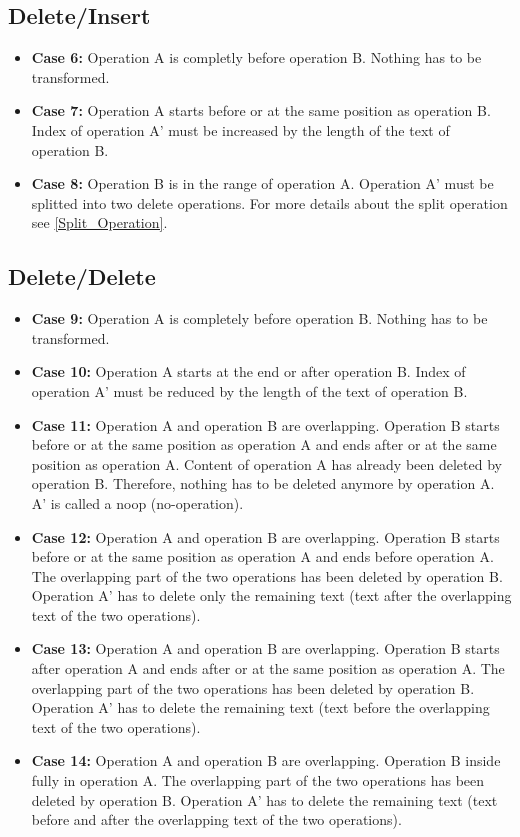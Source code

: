 \subsection{Delete/Insert}
\label{Delete_Insert}
\begin{itemize}
\item \textbf{Case 6:}
Operation A is completly before operation B. Nothing has to be transformed.
\item \textbf{Case 7:}
Operation A starts before or at the same position as operation B. Index of operation A' must be increased by the length of the text of operation B.
\item \textbf{Case 8:}
Operation B is in the range of operation A. Operation A' must be splitted into two delete operations. For more details about the split operation see \ref{Split_Operation}.
\end{itemize}

\subsection{Delete/Delete}
\begin{itemize}
\item \textbf{Case 9:}
Operation A is completely before operation B. Nothing has to be transformed.
\item \textbf{Case 10:}
Operation A starts at the end or after operation B. Index of operation A' must be reduced by the length of the text of operation B.
\item \textbf{Case 11:}
Operation A and operation B are overlapping. Operation B starts before or at the same position as operation A and ends after or at the same position as operation A. Content of operation A has already been deleted by operation B. Therefore, nothing has to be deleted anymore by operation A. A' is called a noop (no-operation).
\item \textbf{Case 12:}
Operation A and operation B are overlapping. Operation B starts before or at the same position as operation A and ends before operation A. The overlapping part of the two operations has been deleted by operation B. Operation A' has to delete only the remaining text (text after the overlapping text of the two operations).
\item \textbf{Case 13:}
Operation A and operation B are overlapping. Operation B starts after operation A and ends after or at the same position as operation A. The overlapping part of the two operations has been deleted by operation B. Operation A' has to delete the remaining text (text before the overlapping text of the two operations).
\item \textbf{Case 14:}
Operation A and operation B are overlapping. Operation B inside fully in operation A. The overlapping part of the two operations has been deleted by operation B. Operation A' has to delete the remaining text (text before and after the overlapping text of the two operations).
\end{itemize}


